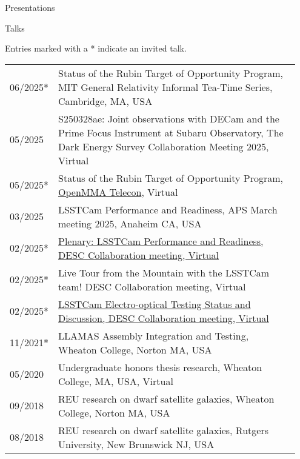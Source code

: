\documentclass{resume} %
\begin{document}
\begin{rSection}{Presentations}

\begin{rSubsection}{Talks}{}{}{}

Entries marked with a * indicate an invited talk.

    \begin{table}[h]
\begin{tabular}{p{0.07\linewidth} p{0.88\linewidth}}
06/2025* & Status of the Rubin Target of Opportunity Program, MIT General Relativity Informal Tea-Time Series, Cambridge, MA, USA\\
05/2025 & S250328ae: Joint observations with DECam and the Prime Focus Instrument at Subaru Observatory, The Dark Energy Survey Collaboration Meeting 2025, Virtual\\
05/2025* & Status of the Rubin Target of Opportunity Program, \href{https://github.com/scimma/openMMA/wiki/Telecon20250522}{OpenMMA Telecon}, Virtual\\
03/2025 & LSSTCam Performance and Readiness, APS March meeting 2025, Anaheim CA, USA\\
02/2025* & \href{https://docs.google.com/presentation/d/18RmTzV5id9RSE4_1xui-RJvK5FeGknrt8Ro1nBn32nk/edit?usp=sharing}{Plenary: LSSTCam Performance and Readiness, DESC Collaboration meeting, Virtual}\\
02/2025* & Live Tour from the Mountain with the LSSTCam team! DESC Collaboration meeting, Virtual\\
02/2025* & \href{https://docs.google.com/presentation/d/12EPsuWSixo40_oqrDPNaXstYnqDzhI_2aFL2hd7IwTE/edit#slide=id.g2ade3bc380_0_0}{LSSTCam Electro-optical Testing Status and Discussion, DESC Collaboration meeting, Virtual}\\
11/2021* & LLAMAS Assembly Integration and Testing, Wheaton College, Norton MA, USA\\
05/2020 & Undergraduate honors thesis research, Wheaton College, MA, USA, Virtual\\ 
09/2018 & REU research on dwarf satellite galaxies, Wheaton College, Norton MA, USA\\
08/2018 & REU research on dwarf satellite galaxies, Rutgers University, New Brunswick NJ, USA\\
\end{tabular}
\end{table}
\end{rSubsection}


\end{rSection}
\end{document}
